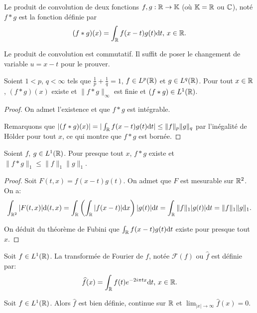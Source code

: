 \begin{df}
Le produit de convolution de deux fonctions $f, g:\mathbb{R}\to\mathbb{K}$
(où $\mathbb{K} = \mathbb{R}$ ou $\mathbb{C}$), noté $f * g$ est la fonction définie par
$$(f * g)(x) = \int_{\mathbb{R}}f(x-t)g(t)\mathrm{d} t\mbox{, } x\in\mathbb{R}.$$
\end{df}

Le produit de convolution est commutatif. Il suffit de poser
le changement de variable $u = x - t$ pour le prouver.

\begin{thm}%
  Soient $1 < p$, $q <\infty$ tels que $\frac{1}{p} + \frac{1}{q} = 1$,
  $f\in L^p(\mathbb{R})$ et $g\in L^q(\mathbb{R})$.
  Pour tout $x\in \mathbb{R}$, $(f * g)(x)$ existe et $\|f * g\|_\infty$ est finie
  et $(f * g)\in L^1(\mathbb{R})$.
\end{thm}

\begin{proof}
  On admet l'existence et que $f * g$ est intégrable.

  Remarquons que $|(f  * g)(x)| =
  |\int_{\mathbb{R}}f(x-t)g(t)\mathrm{d} t | \leq \|f\|_p \|g\|_q$ par l'inégalité de Hölder
  pour tout $x$, ce qui montre que $f * g$ est bornée.
\end{proof}

\begin{thm}
  Soient $f$, $g\in L^1(\mathbb{R})$. Pour presque tout $x$, $f * g$ existe et
  $\|f * g \|_1\leq \|f\|_1 \|g\|_1$.
\end{thm}
\begin{proof}
  Soit $F(t, x) = f(x - t)g(t)$. On admet que $F$ est mesurable sur $\mathbb{R}^2$.
  On a:
  $$\int_{\mathbb{R}^2}|F(t, x)|\mathrm{d}(t, x) =
  \int_{\mathbb{R}} \left(\int_{\mathbb{R}}|f(x - t)| \mathrm{d} x\right) |g(t)|\mathrm{d} t =
  \int_{\mathbb{R}} \|f\|_1 |g(t)|\mathrm{d} t = \|f\|_1 \|g\|_1.$$

  On déduit du théorème de Fubini que $\int_{\mathbb{R}} f(x - t) g(t) \mathrm{d} t$ existe
  pour presque tout $x$.
\end{proof}

\begin{df}
Soit $f\in L^1(\mathbb{R})$. La transformée de Fourier de $f$, notée $\mathcal F(f)$
ou $\widehat{f}$ est définie par:
$$\widehat{f}(x) = \int_{\mathbb{R}} f(t) e^{-2i\pi t x}\mathrm{d} t\mbox{, } x\in \mathbb{R}.$$
\end{df}

\begin{prop}
  Soit $f\in L^1(\mathbb{R})$. Alors $\widehat{f}$ est bien définie,
  continue sur $\mathbb{R}$ et
  $\lim_{|x|\to\infty}\widehat{f}(x) = 0$.
\end{prop}

